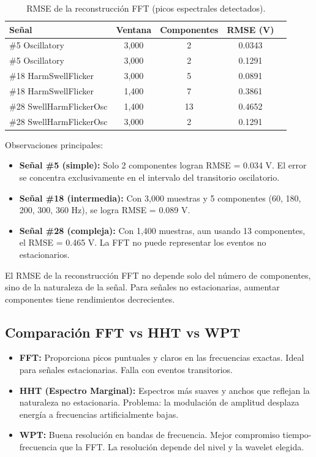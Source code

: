 \documentclass[12pt,a4paper]{article}
\begin{document}
\begin{table}[H]
\centering
\caption{RMSE de la reconstrucción FFT (picos espectrales detectados).}
\begin{tabular}{@{}lcccc@{}}
\toprule
\textbf{Señal} & \textbf{Ventana} & \textbf{Componentes} & \textbf{RMSE (V)} \\
\midrule
\#5 Oscillatory & 3{,}000 & 2 & 0.0343 \\
\#5 Oscillatory & 3{,}000 & 2 & 0.1291 \\
\#18 HarmSwellFlicker & 3{,}000 & 5 & 0.0891 \\
\#18 HarmSwellFlicker & 1{,}400 & 7 & 0.3861 \\
\#28 SwellHarmFlickerOsc & 1{,}400 & 13 & 0.4652 \\
\#28 SwellHarmFlickerOsc & 3{,}000 & 2 & 0.1291 \\
\bottomrule
\end{tabular}
\label{tab:rmse_fft}
\end{table}

Observaciones principales:
\begin{itemize}
    \item \textbf{Señal \#5 (simple):} Solo 2 componentes logran RMSE = 0.034 V. El error se concentra exclusivamente en el intervalo del transitorio oscilatorio.
    \item \textbf{Señal \#18 (intermedia):} Con 3{,}000 muestras y 5 componentes (60, 180, 200, 300, 360 Hz), se logra RMSE = 0.089 V.
    \item \textbf{Señal \#28 (compleja):} Con 1{,}400 muestras, aun usando 13 componentes, el RMSE = 0.465 V. La FFT no puede representar los eventos no estacionarios.
\end{itemize}

El RMSE de la reconstrucción FFT no depende solo del número de componentes, sino de la naturaleza de la señal. Para señales no estacionarias, aumentar componentes tiene rendimientos decrecientes.


\subsection{Comparación FFT vs HHT vs WPT}

\begin{itemize}
    \item \textbf{FFT:} Proporciona picos puntuales y claros en las frecuencias exactas. Ideal para señales estacionarias. Falla con eventos transitorios.
    \item \textbf{HHT (Espectro Marginal):} Espectros más suaves y anchos que reflejan la naturaleza no estacionaria. Problema: la modulación de amplitud desplaza energía a frecuencias artificialmente bajas.
    \item \textbf{WPT:} Buena resolución en bandas de frecuencia. Mejor compromiso tiempo-frecuencia que la FFT. La resolución depende del nivel y la wavelet elegida.
\end{itemize}
\end{document}
